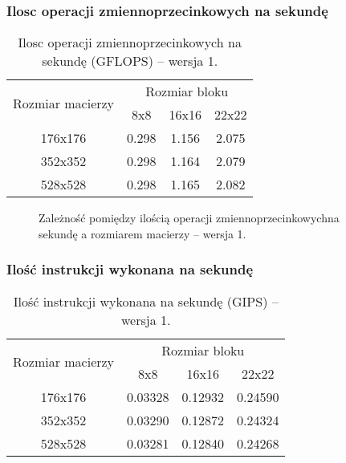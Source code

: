 \subsubsection{Ilosc operacji zmiennoprzecinkowych na sekundę}

\begin{table}[H]
\centering
\begin{tabular}{|c|c|c|c|}
\hline
\multirow{2}{*}{Rozmiar macierzy} & \multicolumn{3}{c|}{Rozmiar bloku} \\ \cline{2-4}
& 8x8 & 16x16 & 22x22 \\ \hline
176x176 & 0.298 & 1.156 & 2.075 \\ \hline
352x352 & 0.298 & 1.164 & 2.079 \\ \hline
528x528 & 0.298 & 1.165 & 2.082 \\ \hline
\end{tabular}
\caption{Ilosc operacji zmiennoprzecinkowych na sekundę (GFLOPS) -- wersja 1.}
\end{table}

\begin{figure}[H]
\centering
\caption{Zależność pomiędzy ilością operacji zmiennoprzecinkowychna sekundę a rozmiarem macierzy -- wersja 1.}
\end{figure}


\subsubsection{Ilość instrukcji wykonana na sekundę}

\begin{table}[H]
\centering
\begin{tabular}{|c|c|c|c|}
\hline
\multirow{2}{*}{Rozmiar macierzy} & \multicolumn{3}{c|}{Rozmiar bloku} \\ \cline{2-4}
& 8x8 & 16x16 & 22x22 \\ \hline
176x176 & 0.03328 & 0.12932 & 0.24590 \\ \hline
352x352 & 0.03290 & 0.12872 & 0.24324 \\ \hline
528x528 & 0.03281 & 0.12840 & 0.24268 \\ \hline
\end{tabular}
\caption{Ilość instrukcji wykonana na sekundę (GIPS) -- wersja 1.}
\end{table}

